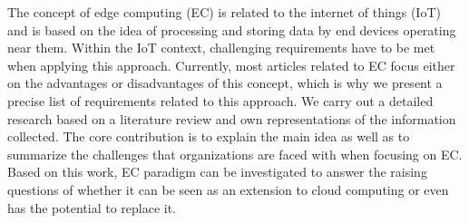 The concept of edge computing (EC) is related to the internet of things (IoT) and is based on the idea of processing and storing data by end devices operating near them. Within the IoT context, challenging requirements have to be met when applying this approach. Currently, most articles related to EC focus either on the advantages or disadvantages of this concept, which is why we present a precise list of requirements related to this approach. We carry out a detailed research based on a literature review and own representations of the information collected. The core contribution is to explain the main idea as well as to summarize the challenges that organizations are faced with when focusing on EC. Based on this work, EC paradigm can be investigated to answer the raising questions of whether it can be seen as an extension to cloud computing or even has the potential to replace it.